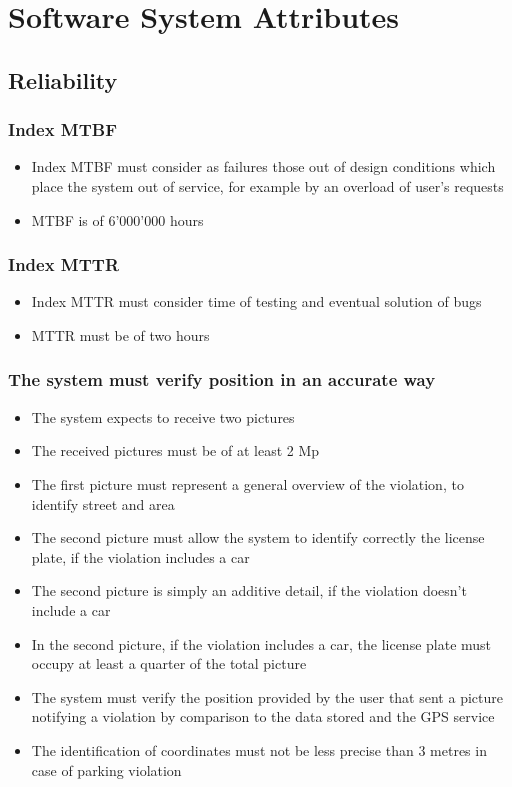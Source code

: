 \section{Software System Attributes}

\subsection{Reliability}
\subsubsection{Index MTBF}
\begin{itemize}
    \item Index MTBF must consider as failures those out of design conditions which place the system out of service, for example by an overload of user’s requests
    \item MTBF is of 6'000'000 hours
\end{itemize}

\subsubsection{Index MTTR}
\begin{itemize}
    \item Index MTTR must consider time of testing and eventual solution of bugs
    \item MTTR must be of two hours
\end{itemize}

\subsubsection{The system must verify position in an accurate way}
\begin{itemize}
    \item The system expects to receive two pictures			
    \item The received pictures must be of at least 2 Mp
    \item The first picture must represent a general overview of the violation, to identify street and area
    \item The second picture must allow the system to identify correctly the license plate, if the violation includes a car
    \item The second picture is simply an additive detail, if the violation doesn't include a car
    \item In the second picture, if the violation includes a car, the license plate must occupy at least a quarter of the total picture
    \item The system must verify the position provided by the user that sent a picture notifying a violation by comparison to the data stored and the GPS service
    \item The identification of coordinates must not be less precise than 3 metres in case of parking violation
\end{itemize}

